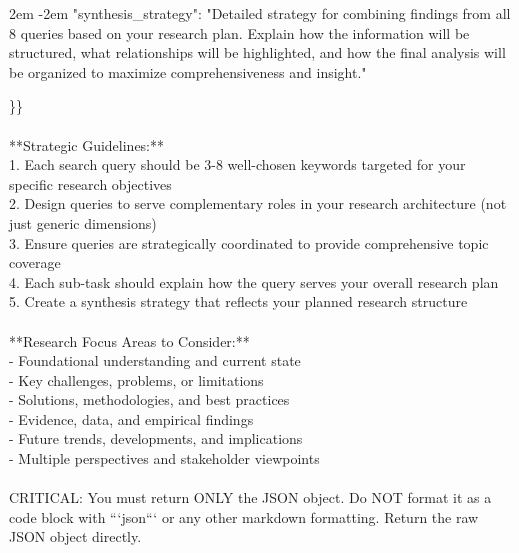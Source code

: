 \documentclass{article} %
\newcommand{\mlblock}[2][2em]{%
  {\begingroup
   \par\noindent
   \parshape=1 #1 \dimexpr\linewidth-#1\relax
   #2\par
   \endgroup}%
}
\begin{document}
\begin{examplebox}
\mlblock[2em]{"synthesis\_strategy": "Detailed strategy for combining findings from all 8 queries based on your research plan. Explain how the information will be structured, what relationships will be highlighted, and how the final analysis will be organized to maximize comprehensiveness and insight."} 
\}\} \\
\\
**Strategic Guidelines:**\\
1. Each search query should be 3-8 well-chosen keywords targeted for your specific research objectives\\
2. Design queries to serve complementary roles in your research architecture (not just generic dimensions)\\
3. Ensure queries are strategically coordinated to provide comprehensive topic coverage\\
4. Each sub-task should explain how the query serves your overall research plan\\
5. Create a synthesis strategy that reflects your planned research structure\\ \\
**Research Focus Areas to Consider:**\\
- Foundational understanding and current state\\
- Key challenges, problems, or limitations\\
- Solutions, methodologies, and best practices\\
- Evidence, data, and empirical findings\\
- Future trends, developments, and implications\\
- Multiple perspectives and stakeholder viewpoints\\
\\
CRITICAL: You must return ONLY the JSON object. Do NOT format it as a code block with ```json``` or any other markdown formatting. Return the raw JSON object directly. \end{examplebox}
\end{document}
